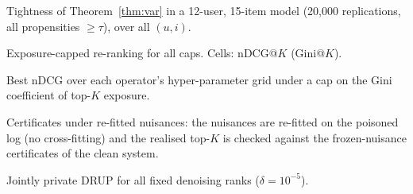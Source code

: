 \documentclass[preprint,review,12pt,authoryear]{elsarticle}
\theoremstyle{definition}
\begin{document}
\begin{table}[h]\centering\small
\caption{Tightness of Theorem~\ref{thm:var} in a 12-user, 15-item model (20{,}000
replications, all propensities $\ge\tau$), over all $(u,i)$.}\label{tab:bounds}
\begin{adjustbox}{max width=\textwidth}\end{adjustbox}
\end{table}

\begin{table}[h]\centering\small
\caption{Exposure-capped re-ranking for all caps. Cells: nDCG@$K$ (Gini@$K$).}\label{tab:rerankfull}
\begin{adjustbox}{max width=\textwidth}\end{adjustbox}

\medskip
\begin{adjustbox}{max width=\textwidth}\end{adjustbox}

\medskip
\begin{adjustbox}{max width=\textwidth}\end{adjustbox}
\end{table}

\begin{table}[h]\centering\small
\caption{Best nDCG over each operator's hyper-parameter grid under a cap on the
Gini coefficient of top-$K$ exposure.}\label{tab:frontier}
\begin{adjustbox}{max width=\textwidth}

\end{adjustbox}
\end{table}

\begin{table}[h]\centering\small
\caption{Certificates under re-fitted nuisances: the nuisances are re-fitted on the
poisoned log (no cross-fitting) and the realised top-$K$ is checked against the
frozen-nuisance certificates of the clean system.}\label{tab:refit}
\begin{adjustbox}{max width=\textwidth}

\end{adjustbox}
\end{table}

\begin{table}[h]\centering\small
\caption{Jointly private DRUP for all fixed denoising ranks ($\delta=10^{-5}$).}\label{tab:privfull}
\begin{adjustbox}{max width=\textwidth}

\end{adjustbox}
\end{table}
\end{document}
